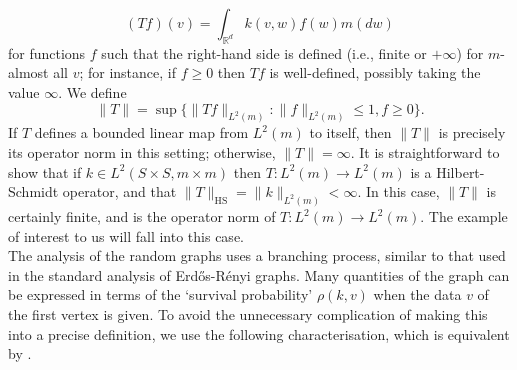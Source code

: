 \begin{equation}\label{eq: T}
       (T f)(v)=\int_{\mathbb{R}^d} k(v,w)f(w)m(dw) 
   \end{equation} for functions $f$ such that the right-hand side is defined (i.e., finite or $+\infty$) for $m$-almost all $v$; for instance, if $f\ge 0$ then $Tf$ is well-defined, possibly taking the value $\infty$. We define \begin{equation} \|T\|=\sup\{\|Tf\|_{L^2(m)}: \|f\|_{L^2(m)}\le 1, f\ge 0\}. \end{equation} If $T$ defines a bounded linear map from $L^2(m)$ to itself, then $\|T\|$ is precisely its operator norm in this setting; otherwise, $\|T\|=\infty.$ It is straightforward to show that if $k\in L^2(S\times S, m\times m)$ then $T: L^2(m)\rightarrow L^2(m)$ is a Hilbert-Schmidt operator, and that $\|T\|_\text{HS}=\|k\|_{L^2(m)}<\infty$. In this case, $\|T\|$ is certainly finite, and is the operator norm of $T: L^2(m)\rightarrow L^2(m)$. The example of interest to us will fall into this case. \bigskip\\  The analysis of the random graphs uses a branching process, similar to that used in the standard analysis of Erd\H{o}s-R\'enyi graphs. Many quantities of the graph can be expressed in terms of the `survival probability' $\rho(k, v)$ when the data $v$ of the first vertex is given. To avoid the unnecessary complication of making this into a precise definition, we use the following characterisation, which is equivalent by \cite[Theorem 6.2]{BJR07}.
